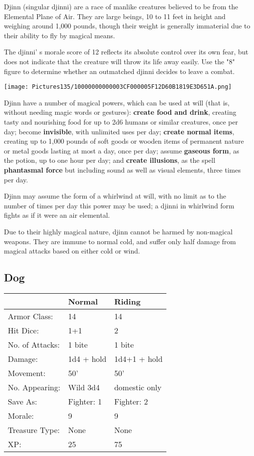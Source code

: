 \documentclass[a4paper,twoside,openany,10pt]{book}
\begin{document}
\begin{multicols}{2}
Djinn (singular djinni) are a race of manlike creatures believed to be from the Elemental Plane of Air. They are large beings, 10 to 11 feet in height and weighing around 1,000 pounds, though their weight is generally immaterial due to their ability to fly by magical means.

The djinni' s morale score of 12 reflects its absolute control over its own fear, but does not indicate that the creature will throw its life away easily. Use the "8" figure to determine whether an outmatched djinni decides to leave a combat.


\begin{center}
	\texttt{[image: Pictures135/10000000000003CF000005F12D60B1819E3D651A.png]}
\end{center}

Djinn have a number of magical powers, which can be used at will (that is, without needing magic words or gestures): \textbf{create food and drink}, creating tasty and nourishing food for up to 2d6 humans or similar creatures, once per day; become \textbf{invisible}, with unlimited uses per day; \textbf{create normal items}, creating up to 1,000 pounds of soft goods or wooden items of permanent nature or metal goods lasting at most a day, once per day; assume \textbf{gaseous form}, as the potion, up to one hour per day; and \textbf{create illusions}, as the spell \textbf{phantasmal force} but including sound as well as visual elements, three times per day.

Djinn may assume the form of a whirlwind at will, with no limit as to the number of times per day this power may be used; a djinni in whirlwind form fights as if it were an air elemental.

Due to their highly magical nature, djinn cannot be harmed by non-magical weapons. They are immune to normal cold, and suffer only half damage from magical attacks based on either cold or wind.

\subsection*{Dog}\label{dog}

\begin{tabularx}{0.48\textwidth}{lXX}
& Normal & Riding \\\hline
Armor Class: & 14 & 14 \\\hline
Hit Dice: & 1+1 & 2 \\\hline
No. of Attacks: & 1 bite & 1 bite \\\hline
Damage: & 1d4 + hold & 1d4+1 + hold \\\hline
Movement: & 50' & 50' \\\hline
No. Appearing: & Wild 3d4 & domestic only \\\hline
Save As: & Fighter: 1 & Fighter: 2 \\\hline
Morale: & 9 & 9 \\\hline
Treasure Type: & None & None \\\hline
XP: & 25 & 75 \\\hline
\end{tabularx}\medskip


\end{multicols}
\end{document}
